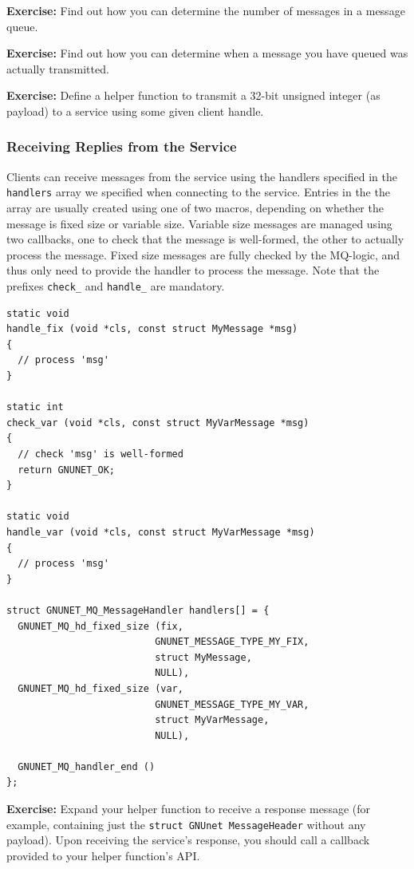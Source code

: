 \documentclass[10pt]{article}
\newcommand{\exercise}[1]{\noindent\begin{boxedminipage}{\textwidth}{\bf Exercise:} #1 \end{boxedminipage}}
\begin{document}
\exercise{Find out how you can determine the number of messages in a message queue.}

\exercise{Find out how you can determine when a message you have queued was actually transmitted.}

\exercise{Define a helper function to transmit a 32-bit
unsigned integer (as payload) to a service using some given client
handle.}


\subsubsection{Receiving Replies from the Service}

Clients can receive messages from the service using the handlers
specified in the {\tt handlers} array we specified when connecting
to the service.  Entries in the the array are usually created using
one of two macros, depending on whether the message is fixed size
or variable size.  Variable size messages are managed using two
callbacks, one to check that the message is well-formed, the other
to actually process the message.  Fixed size messages are fully
checked by the MQ-logic, and thus only need to provide the handler
to process the message.  Note that the prefixes {\tt check\_}
and {\tt handle\_} are mandatory.

\lstset{language=c}
\begin{lstlisting}
static void
handle_fix (void *cls, const struct MyMessage *msg)
{
  // process 'msg'
}

static int
check_var (void *cls, const struct MyVarMessage *msg)
{
  // check 'msg' is well-formed
  return GNUNET_OK;
}

static void
handle_var (void *cls, const struct MyVarMessage *msg)
{
  // process 'msg'
}

struct GNUNET_MQ_MessageHandler handlers[] = {
  GNUNET_MQ_hd_fixed_size (fix,
                          GNUNET_MESSAGE_TYPE_MY_FIX,
                          struct MyMessage,
                          NULL),
  GNUNET_MQ_hd_fixed_size (var,
                          GNUNET_MESSAGE_TYPE_MY_VAR,
                          struct MyVarMessage,
                          NULL),

  GNUNET_MQ_handler_end ()
};
\end{lstlisting}

\exercise{Expand your helper function to receive a response message
  (for example, containing just the {\tt struct GNUnet MessageHeader}
  without any payload).  Upon receiving the service's response, you
  should call a callback provided to your helper function's API.}
\end{document}
